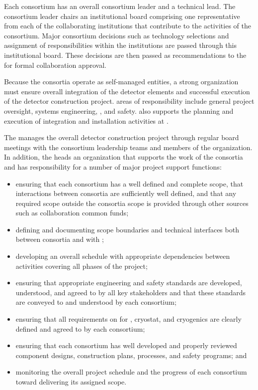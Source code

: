 Each consortium has an overall consortium leader 
and a technical lead.  The consortium leader chairs an institutional 
board comprising one representative from each of the collaborating 
institutions that contribute to the activities of the consortium.  Major 
consortium decisions such as technology selections and assignment of 
responsibilities within the institutions are passed through this institutional 
board.  These decisions are then passed as recommendations to 
the   for formal collaboration approval.

Because the consortia operate as self-managed entities, a strong
 organization must ensure overall integration 
of the detector elements and successful execution of the detector
construction project.   areas of responsibility include 
general project oversight, systems engineering, , and 
safety.   also supports the planning and execution 
of integration and installation activities at .  

The  manages the overall detector construction project
through regular board meetings with the consortium leadership teams 
and members of the  organization.  
%
In addition, the  heads %
an organization that supports the work of 
the consortia and has responsibility for a number of major project 
support functions: 
\begin{itemize}
\item ensuring that each consortium has a well defined and complete
  scope, that interactions between consortia are sufficiently 
  well defined, and that any required scope outside the 
  consortia scope is provided through other sources such as collaboration
  common funds;
\item defining and documenting scope boundaries and technical 
  interfaces both between consortia and with ;  
\item developing an overall schedule with appropriate dependencies
  between activities covering all phases of the project;  
\item ensuring that appropriate engineering and safety standards 
  are developed, understood, and agreed to by all key stakeholders 
  and that these standards are conveyed to and understood by each
  consortium;
\item ensuring that all  requirements on  
  for , cryostat, and cryogenics are clearly defined and 
  agreed to by each consortium;
\item ensuring that each consortium has well developed and properly reviewed
  component designs, construction plans,  processes, and 
  safety programs; and
\item monitoring the overall project schedule and the progress of 
  each consortium toward delivering its assigned scope. 
\end{itemize}

